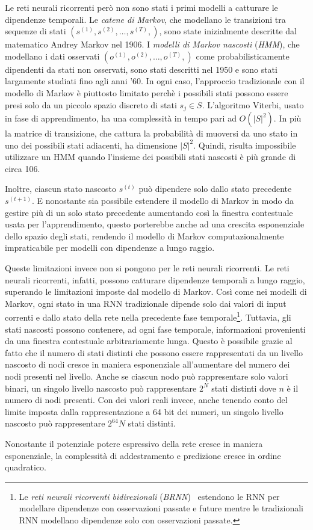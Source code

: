 Le reti neurali ricorrenti per\`o non sono stati i primi modelli a catturare le
dipendenze temporali. Le \emph{catene di Markov}, che modellano le transizioni
tra sequenze di stati $(s^{(1)}, s^{(2)}, \dots, s^{(T)},)$, sono state inizialmente
descritte dal matematico Andrey Markov nel 1906. I \emph{modelli di Markov nascosti}
(\emph{HMM}), che modellano i dati osservati $(o^{(1)}, o^{(2)}, \dots, o^{(T)},)$
come probabilisticamente dipendenti da stati non osservati, sono stati descritti
nel 1950 e sono stati largamente studiati fino agli anni '60.
In ogni caso, l'approccio tradizionale con il modello di Markov \`e piuttosto
limitato perch\`e i possibili stati possono essere presi solo da un piccolo spazio
discreto di stati $ s_j \in S$. L'algoritmo Viterbi, usato in fase di apprendimento,
ha una complessit\`a in tempo pari ad $O(|S|^2)$. In pi\`u la matrice di transizione,
che cattura la probabilit\`a di muoversi da uno stato in uno dei possibili stati
adiacenti, ha dimensione $|S|^2$. Quindi, risulta impossibile utilizzare un HMM
quando l'insieme dei possibili stati nascosti \`e pi\`u grande di circa 106.

Inoltre, ciascun stato nascosto $s^{(t)}$ pu\`o dipendere solo dallo stato
precedente $s^{(t+1)}$. E nonostante sia possibile estendere il modello di Markov
in modo da gestire pi\`u di un solo stato precedente aumentando cos\`i la finestra
contestuale usata per l'apprendimento, questo porterebbe anche ad una crescita
esponenziale dello spazio degli stati, rendendo il modello di Markov computazionalmente
impraticabile per modelli con dipendenze a lungo raggio.

Queste limitazioni invece non si pongono per le reti neurali ricorrenti. Le reti
neurali ricorrenti, infatti, possono catturare dipendenze temporali a lungo raggio,
superando le limitazioni imposte dal modello di Markov. Cos\`i come nei modelli
di Markov, ogni stato in una RNN tradizionale dipende solo dai valori di input
correnti e dallo stato della rete nella precedente fase temporale\footnote{Le
\emph{reti neurali ricorrenti bidirezionali} (\emph{BRNN})~\cite{Schuster:1997}
estendono le RNN per modellare dipendenze con osservazioni passate e future mentre
le tradizionali RNN modellano dipendenze solo con osservazioni passate.}. Tuttavia,
gli stati nascosti possono contenere, ad ogni fase temporale, informazioni
provenienti da una finestra contestuale arbitrariamente lunga. Questo \`e possibile
grazie al fatto che il numero di stati distinti che possono essere rappresentati
da un livello nascosto di nodi cresce in maniera esponenziale all'aumentare del
numero dei nodi presenti nel livello. Anche se ciascun nodo pu\`o rappresentare
solo valori binari, un singolo livello nascosto pu\`o rappresentare $2^N$ stati
distinti dove $n$ \`e il numero di nodi presenti. Con dei valori reali invece,
anche tenendo conto del limite imposta dalla rappresentazione a 64 bit dei numeri,
un singolo livello nascosto pu\`o rappresentare $2^64N$ stati distinti.

Nonostante il potenziale potere espressivo della rete cresce in maniera esponenziale,
la complessit\`a di addestramento e predizione cresce in ordine quadratico.

